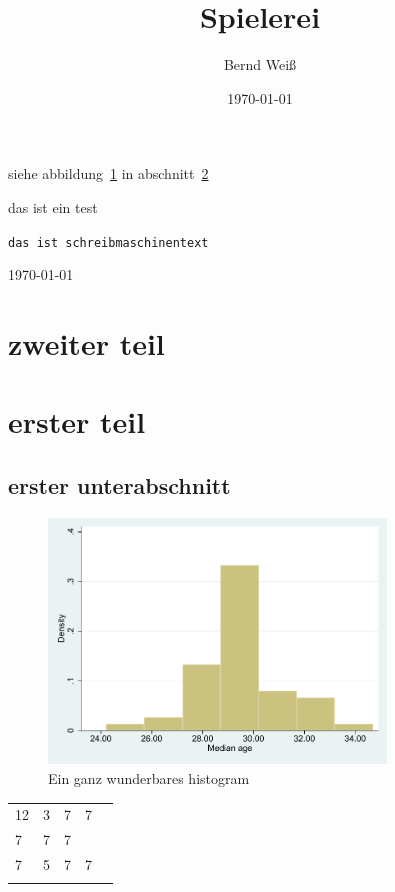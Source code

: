 \documentclass{scrartcl}
\title{Spielerei}
\author{Bernd Weiß}
\date{\today}
\begin{document}
\maketitle

\tableofcontents



siehe abbildung~\ref{fig:histogram} in abschnitt~\ref{sec:eins}

	das ist ein test

\texttt{das ist schreibmaschinentext}	

	\today
	


\section{zweiter teil}

\section{erster teil}\label{sec:eins}

\subsection{erster unterabschnitt}

\begin{figure}
    \centering
        \includegraphics[width= 0.8\textwidth]{hist-plot-age.pdf}
    \caption{Ein ganz wunderbares histogram}
    \label{fig:histogram}
\end{figure}


\begin{table}[]
\begin{tabular}{lllll}
12 & 3 & 7 & 7 &  \\
7  & 7 & 7 &   &  \\
7  & 5 & 7 & 7 &  \\
   &   &   &   & 
\end{tabular}
\end{table}
\end{document}
